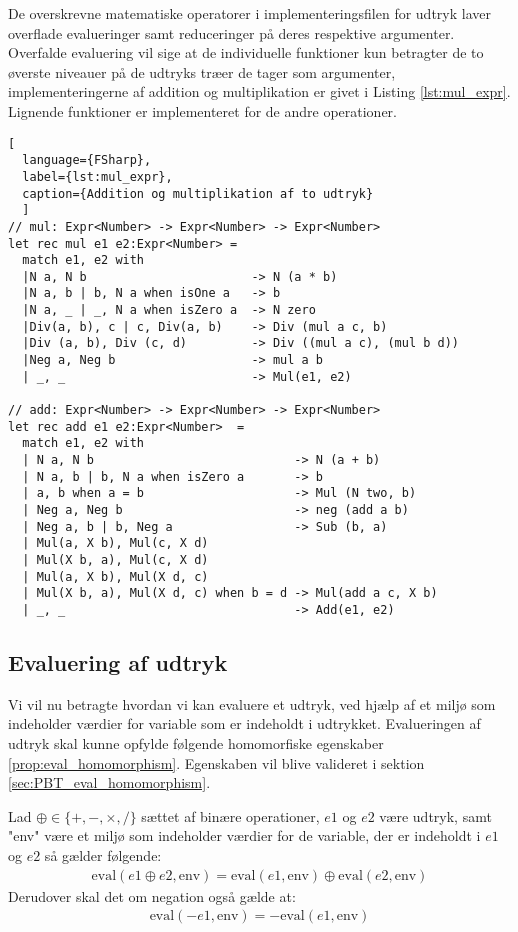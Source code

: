 De overskrevne matematiske operatorer i implementeringsfilen for udtryk laver overflade evalueringer samt reduceringer på deres respektive argumenter. Overfalde evaluering vil sige at de individuelle funktioner kun betragter de to øverste niveauer på de udtryks træer de tager som argumenter, implementeringerne af addition og multiplikation er givet i Listing \ref{lst:mul_expr}. Lignende funktioner er implementeret for de andre operationer.

\begin{lstlisting}[
  language={FSharp}, 
  label={lst:mul_expr}, 
  caption={Addition og multiplikation af to udtryk}
  ]
// mul: Expr<Number> -> Expr<Number> -> Expr<Number>
let rec mul e1 e2:Expr<Number> =
  match e1, e2 with
  |N a, N b                       -> N (a * b)
  |N a, b | b, N a when isOne a   -> b
  |N a, _ | _, N a when isZero a  -> N zero
  |Div(a, b), c | c, Div(a, b)    -> Div (mul a c, b)
  |Div (a, b), Div (c, d)         -> Div ((mul a c), (mul b d))
  |Neg a, Neg b                   -> mul a b
  | _, _                          -> Mul(e1, e2)

// add: Expr<Number> -> Expr<Number> -> Expr<Number>
let rec add e1 e2:Expr<Number>  =
  match e1, e2 with
  | N a, N b                            -> N (a + b)
  | N a, b | b, N a when isZero a       -> b
  | a, b when a = b                     -> Mul (N two, b)
  | Neg a, Neg b                        -> neg (add a b) 
  | Neg a, b | b, Neg a                 -> Sub (b, a)
  | Mul(a, X b), Mul(c, X d) 
  | Mul(X b, a), Mul(c, X d)
  | Mul(a, X b), Mul(X d, c) 
  | Mul(X b, a), Mul(X d, c) when b = d -> Mul(add a c, X b)
  | _, _                                -> Add(e1, e2)

\end{lstlisting}

\subsection{Evaluering af udtryk}\label{sec:eval}
Vi vil nu betragte hvordan vi kan evaluere et udtryk, ved hjælp af et miljø som indeholder værdier for variable som er indeholdt i udtrykket. Evalueringen af udtryk skal kunne opfylde følgende homomorfiske egenskaber \ref{prop:eval_homomorphism}. Egenskaben vil blive valideret i sektion \ref{sec:PBT_eval_homomorphism}.
\vspace{0.5cm}
\begin{egenskab}\label{prop:eval_homomorphism}
Lad $\oplus \in \{+, -, \times, /\}$ sættet af binære operationer, $e1$ og $e2$ være udtryk, samt "env" være et miljø som indeholder værdier for de variable, der er indeholdt i $e1$ og $e2$ så gælder følgende:
\begin{align*}
    \text{eval}(e1 \oplus e2, \text{env}) = \text{eval}(e1, \text{env}) \oplus \text{eval}(e2, \text{env})
\end{align*}
Derudover skal det om negation også gælde at:
\begin{align*}
    \text{eval}(-e1, \text{env}) = -\text{eval}(e1, \text{env})
\end{align*}
\end{egenskab}


